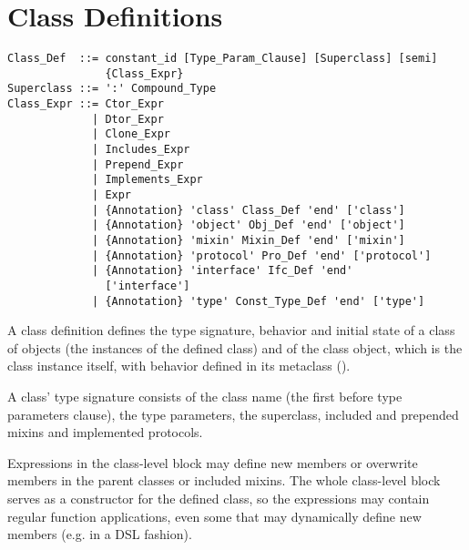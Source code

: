 \section{Class Definitions}
\label{sec:class-definitions}

\syntax\begin{lstlisting}
Class_Def  ::= constant_id [Type_Param_Clause] [Superclass] [semi]
               {Class_Expr}
Superclass ::= ':' Compound_Type
Class_Expr ::= Ctor_Expr
             | Dtor_Expr
             | Clone_Expr
             | Includes_Expr
             | Prepend_Expr
             | Implements_Expr
             | Expr
             | {Annotation} 'class' Class_Def 'end' ['class']
             | {Annotation} 'object' Obj_Def 'end' ['object']
             | {Annotation} 'mixin' Mixin_Def 'end' ['mixin']
             | {Annotation} 'protocol' Pro_Def 'end' ['protocol']
             | {Annotation} 'interface' Ifc_Def 'end' 
               ['interface']
             | {Annotation} 'type' Const_Type_Def 'end' ['type']
\end{lstlisting}

A class definition defines the type signature, behavior and initial state of a class of objects (the instances of the defined class) and of the class object, which is the class instance itself, with behavior defined in its metaclass (). 

A class' type signature consists of the class name (the first  before type parameters clause), the type parameters, the superclass, included and prepended mixins and implemented protocols. 

Expressions in the class-level block may define new members or overwrite members in the parent classes or included mixins. The whole class-level block serves as a constructor for the defined class, so the expressions may contain regular function applications, even some that may dynamically define new members (e.g. in a DSL fashion). 


